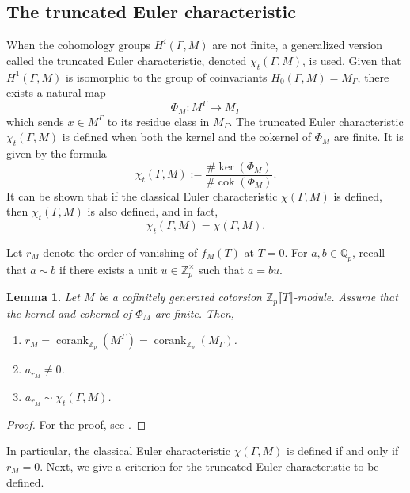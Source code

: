 \documentclass[12pt]{amsart}
\newtheorem{lemma}[theorem]{Lemma}
\newcommand{\Z}{\mathbb{Z}}
\numberwithin{equation}{section}
\begin{document}
\subsection{The truncated Euler characteristic}

\par When the cohomology groups $ H^i(\Gamma, M) $ are not finite, a generalized version called the truncated Euler characteristic, denoted $ \chi_t(\Gamma, M) $, is used. Given that $ H^1(\Gamma, M) $ is isomorphic to the group of coinvariants $ H_0(\Gamma, M) = M_{\Gamma} $, there exists a natural map 
\[
\Phi_{M}: M^{\Gamma} \rightarrow M_{\Gamma}
\]
which sends $ x \in M^{\Gamma} $ to its residue class in $ M_{\Gamma} $. The truncated Euler characteristic $ \chi_t(\Gamma, M) $ is defined when both the kernel and the cokernel of $ \Phi_{M} $ are finite. It is given by the formula
\[
\chi_t(\Gamma, M) := \frac{\# \operatorname{ker}(\Phi_{M})}{\# \operatorname{cok}(\Phi_{M})}.
\]
It can be shown that if the classical Euler characteristic $ \chi(\Gamma, M) $ is defined, then $ \chi_t(\Gamma, M) $ is also defined, and in fact,
\[
\chi_t(\Gamma, M) = \chi(\Gamma, M).
\]

Let $ r_{M} $ denote the order of vanishing of $ f_M(T) $ at $ T = 0 $. For $ a, b \in \mathbb{Q}_p $, recall that $ a \sim b $ if there exists a unit $ u \in \mathbb{Z}_p^{\times} $ such that $ a = bu $.

\begin{lemma}
\label{lemmazerbes1}
Let $ M $ be a cofinitely generated cotorsion $ \Z_p\llbracket T\rrbracket $-module. Assume that the kernel and cokernel of $ \Phi_{M} $ are finite. Then,
\begin{enumerate}
\item $ r_{M} = \operatorname{corank}_{\mathbb{Z}_p}(M^{\Gamma}) = \operatorname{corank}_{\mathbb{Z}_p}(M_{\Gamma}) $.
\item $ a_{r_{M}} \neq 0 $.
\item $ a_{r_{M}} \sim \chi_t(\Gamma, M) $.
\end{enumerate}
\end{lemma}

\begin{proof}
    For the proof, see \cite[Lemma 2.11]{zerbes09}.
\end{proof}

In particular, the classical Euler characteristic $ \chi(\Gamma, M) $ is defined if and only if $ r_{M} = 0 $. Next, we give a criterion for the truncated Euler characteristic to be defined. 
\end{document}
